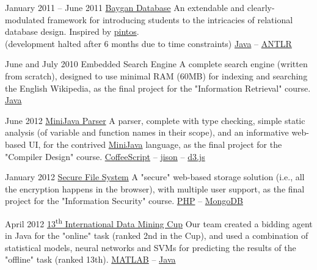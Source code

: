 \documentclass{tccv}
\begin{document}
{{\begin{project_list}
\vspace{-3px}


\item{January 2011 -- June 2011}
	 {}
	 {\href{https://github.com/baygan/Baygan}{Baygan Database}}
	 {An extendable and clearly-modulated framework for introducing students to the intricacies of relational database design. Inspired by \href{http://www.stanford.edu/class/cs140/projects/pintos/pintos.html}{pintos}.\\
(development halted after 6 months due to time constraints)}
	 {
	 	\href{http://www.oracle.com/technetwork/java/}{Java} -- 
		\href{http://www.antlr.org}{ANTLR}
	 }
	 

\vspace{5px}
	 
	 
\item{June and July 2010}
	 {}
	 {Embedded Search Engine}
	 {A complete search engine (written from scratch), designed to use minimal RAM (60MB) for indexing and searching the English Wikipedia, as the final project for the "Information Retrieval" course.}
	 {
		 \href{http://www.oracle.com/technetwork/java/}{Java}
	 }



\item{June 2012}
	 {}
	 {\href{https://github.com/pooriaazimi/Mini-Java}{MiniJava Parser}}
	 {A parser, complete with type checking, simple static analysis (of variable and function names in their scope), and an informative web-based UI, for the contrived \href{http://www.cambridge.org/resources/052182060X/MCIIJ2e/grammar.htm}{MiniJava} language, as the final project for the "Compiler Design" course.}
	 {
		 \href{http://coffeescript.org}{CoffeeScript} -- 
		 \href{http://zaach.github.io/jison/}{jison} -- 
		 \href{http://d3js.org}{d3.js}
	 }



\item{January 2012}
	 {}
	 {\href{https://github.com/pooriaazimi/secure_file_system}{Secure File System}}
	 {A "secure" web-based storage solution (i.e., all the encryption happens in the browser), with multiple user support, as the final project for the "Information Security" course.}
	 {
		 \href{http://php.net}{PHP} -- 
		 \href{http://www.mongodb.org}{MongoDB}
	 }



\item{April 2012}
	 {}
	 {\href{http://www.data-mining-cup.de/en/review/dmc-2012/}{13\textsuperscript{th} International Data Mining Cup}}
	 {Our team created a bidding agent in Java for the "online" task (ranked 2nd in the Cup), and used a combination of statistical models, neural networks and SVMs for predicting the results of the "offline" task (ranked 13th).}
	 {
	 	\href{http://www.mathworks.com/products/matlab/}{MATLAB} -- 
	 	\href{http://www.oracle.com/technetwork/java/}{Java}
	 }




\end{project_list}}}
\end{document}
